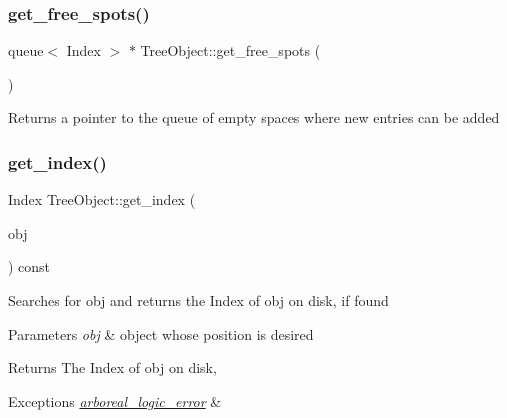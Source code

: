 \subsubsection{\texorpdfstring{get\+\_\+free\+\_\+spots()}{get\_free\_spots()}}
{\footnotesize\ttfamily queue$<$ Index $>$ $\ast$ Tree\+Object\+::get\+\_\+free\+\_\+spots (\begin{DoxyParamCaption}{ }\end{DoxyParamCaption})}

\begin{DoxyReturn}{Returns}
a pointer to the queue of empty spaces where new entries can be added 
\end{DoxyReturn}
\mbox{\label{class_tree_object_ae0983a3ff99d413e22beaaac8d7b6d12}} 
\subsubsection{\texorpdfstring{get\+\_\+index()}{get\_index()}}
{\footnotesize\ttfamily Index Tree\+Object\+::get\+\_\+index (\begin{DoxyParamCaption}\item[{\mbox{\hyperlink{class_tree_object}{Tree\+Object}} $\ast$}]{obj }\end{DoxyParamCaption}) const}

Searches for obj and returns the Index of obj on disk, if found 
\begin{DoxyParams}{Parameters}
{\em obj} & object whose position is desired \\
\hline
\end{DoxyParams}
\begin{DoxyReturn}{Returns}
The Index of obj on disk, 
\end{DoxyReturn}

\begin{DoxyExceptions}{Exceptions}
{\em \mbox{\hyperlink{classarboreal__logic__error}{arboreal\+\_\+logic\+\_\+error}}} & \\
\hline
\end{DoxyExceptions}
\mbox{\label{class_tree_object_a2d7c1a4c2d36c81110ccae09d9724125}} 
